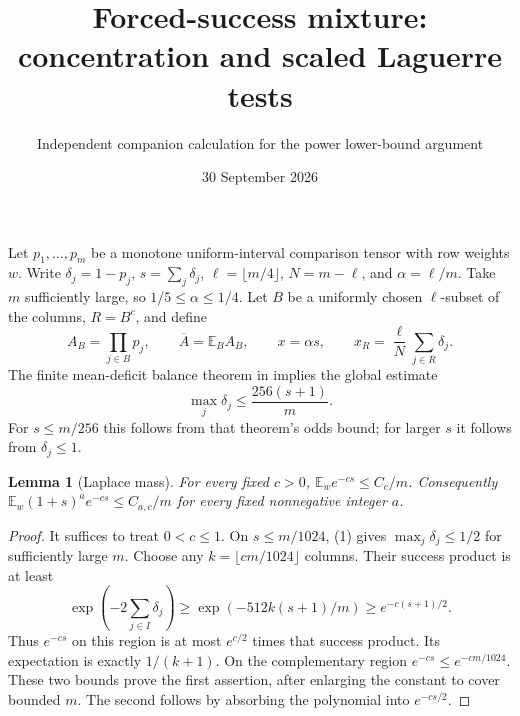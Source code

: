 \documentclass[11pt]{article}
\title{Forced-success mixture: concentration and scaled Laguerre tests}
\author{Independent companion calculation for the power lower-bound argument}
\date{30 September 2026}
\newtheorem{lemma}{Lemma}
\newcommand{\E}{\mathbb E}
\begin{document}
\maketitle
Let $p_1,\ldots,p_m$ be a monotone uniform-interval comparison tensor
with row weights $w$. Write $\delta_j=1-p_j$, $s=\sum_j\delta_j$,
$\ell=\lfloor m/4\rfloor$, $N=m-\ell$, and $\alpha=\ell/m$.
Take $m$ sufficiently large, so $1/5\le\alpha\le1/4$.
Let $B$ be a uniformly chosen $\ell$-subset of the columns, $R=B^c$,
and define
\[
 A_B=\prod_{j\in B}p_j,\qquad
 \overline A=\E_B A_B,\qquad
 x=\alpha s,\qquad x_R=\frac\ell N\sum_{j\in R}\delta_j.
\]
The finite mean-deficit balance theorem in
implies the global estimate
\[
 \max_j\delta_j\le\frac{256(s+1)}m.                 \tag{1}
\]
For $s\le m/256$ this follows from that theorem's odds bound; for
larger $s$ it follows from $\delta_j\le1$.

\begin{lemma}[Laplace mass]
For every fixed $c>0$,
$\E_w e^{-cs}\le C_c/m$.
Consequently $\E_w(1+s)^a e^{-cs}\le C_{a,c}/m$ for every fixed
nonnegative integer $a$.
\end{lemma}
\begin{proof}
It suffices to treat $0<c\le1$. On $s\le m/1024$, (1) gives
$\max_j\delta_j\le1/2$ for sufficiently large $m$. Choose any
$k=\lfloor cm/1024\rfloor$ columns. Their success product is at least
\[
 \exp\left(-2\sum_{j\in I}\delta_j\right)
 \ge\exp\left(-512k(s+1)/m\right)
 \ge e^{-c(s+1)/2}.
\]
Thus $e^{-cs}$ on this region is at most $e^{c/2}$ times that
success product. Its expectation is exactly $1/(k+1)$.
On the complementary region $e^{-cs}\le e^{-cm/1024}$.
These two bounds prove the first assertion, after enlarging the
constant to cover bounded $m$. The second follows by absorbing the
polynomial into $e^{-cs/2}$.
\end{proof}
\end{document}
